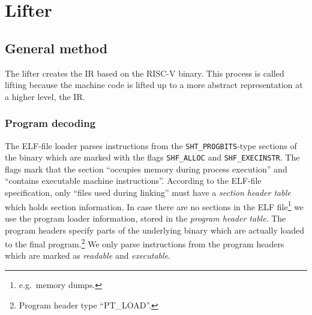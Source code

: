 \documentclass[course=eragp]{aspdoc}
\begin{document}
\section{Lifter}
\subsection{General method}



The lifter creates the IR based on the RISC-V binary. This process is called lifting because the
machine code is lifted up to a more abstract representation at a higher level, the IR.

\subsubsection{Program decoding}

The ELF-file loader parses instructions from the \texttt{SHT\_PROGBITS}-type sections of the binary
which are marked with the flags
\texttt{SHF\_ALLOC} and \texttt{SHF\_EXECINSTR}. The flags mark that the section ``occupies memory during
process execution''\cite[p.~14]{elf_spec} and ``contains executable machine
instructions''\cite[p.~14]{elf_spec}. According to the ELF-file specification, only ``files used
during linking''\cite[p.~2]{elf_spec} must have a \emph{section header table} which holds section
information. In case there are no sections in the ELF file\footnote{e.g.\ memory dumps.} we use the
program loader information, stored in the \emph{program header table}. The program headers
specify parts of the underlying binary which are actually loaded to the final program.\footnote{Program header type ``PT\_LOAD''.}
We only parse instructions from the program headers which are marked as \emph{readable} and
\emph{executable}.
\end{document}
